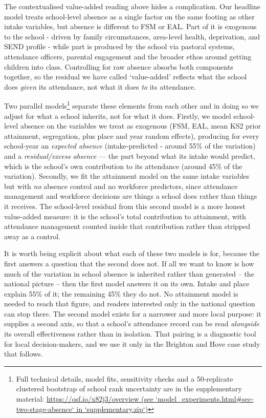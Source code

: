 \documentclass[
  12pt,
  titlepage]{article}
\begin{document}
The contextualised value-added reading above hides a complication. Our
headline model treats school-level absence as a single factor on the
same footing as other intake variables, but absence is different to FSM
or EAL. Part of it is exogenous to the school - driven by family
circumstances, area-level health, deprivation, and SEND profile - while
part is produced by the school via pastoral systems, attendance
officers, parental engagement and the broader ethos around getting
children into class. Controlling for raw absence absorbs both components
together, so the residual we have called `value-added' reflects what the
school does \emph{given} its attendance, not what it does \emph{to} its
attendance.

Two parallel models\footnote{Full technical details, model fits,
  sensitivity checks and a 50-replicate clustered bootstrap of school
  rank uncertainty are in the supplementary material:
  \href{https://osf.io/x82j3/overview}{https://osf.io/x82j3/overview
  (see `model\_experiments.html\#sec-two-stage-absence` in
  `supplementary.zip`)}} separate these elements from each other and in
doing so we adjust for what a school inherits, not for what it does.
Firstly, we model school-level absence on the variables we treat as
exogenous (FSM, EAL, mean KS2 prior attainment, segregation, plus place
and year random effects), producing for every school-year an
\emph{expected absence} (intake-predicted - around 55\% of the
variation) and a \emph{residual/excess absence} --- the part beyond what
its intake would predict, which is the school's own contribution to its
attendance (around 45\% of the variation). Secondly, we fit the
attainment model on the same intake variables but with \emph{no} absence
control and no workforce predictors, since attendance management and
workforce decisions are things a school does rather than things it
receives. The school-level residual from this second model is a more
honest value-added measure: it is the school's total contribution to
attainment, with attendance management counted inside that contribution
rather than stripped away as a control.

It is worth being explicit about what each of these two models is for,
because the first answers a question that the second does not. If all we
want to know is how much of the variation in school absence is inherited
rather than generated -- the national picture -- then the first model
answers it on its own. Intake and place explain 55\% of it; the
remaining 45\% they do not. No attainment model is needed to reach that
figure, and readers interested only in the national question can stop
there. The second model exists for a narrower and more local purpose: it
supplies a second axis, so that a school's attendance record can be read
\emph{alongside} its overall effectiveness rather than in isolation.
That pairing is a diagnostic tool for local decision-makers, and we use
it only in the Brighton and Hove case study that follows.
\end{document}
